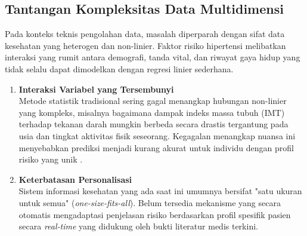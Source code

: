\subsection{Tantangan Kompleksitas Data Multidimensi}
Pada konteks teknis pengolahan data, masalah diperparah dengan sifat data kesehatan yang heterogen dan non-linier. Faktor risiko hipertensi melibatkan interaksi yang rumit antara demografi, tanda vital, dan riwayat gaya hidup yang tidak selalu dapat dimodelkan dengan regresi linier sederhana.

\begin{enumerate}
    \item \textbf{Interaksi Variabel yang Tersembunyi}\\
    Metode statistik tradisional sering gagal menangkap hubungan non-linier yang kompleks, misalnya bagaimana dampak indeks massa tubuh (IMT) terhadap tekanan darah mungkin berbeda secara drastis tergantung pada usia dan tingkat aktivitas fisik seseorang. Kegagalan menangkap nuansa ini menyebabkan prediksi menjadi kurang akurat untuk individu dengan profil risiko yang unik \parencite{Elshawi2019Interpretability}.
    
    \item \textbf{Keterbatasan Personalisasi}\\
    Sistem informasi kesehatan yang ada saat ini umumnya bersifat "satu ukuran untuk semua" (\textit{one-size-fits-all}). Belum tersedia mekanisme yang secara otomatis mengadaptasi penjelasan risiko berdasarkan profil spesifik pasien secara \textit{real-time} yang didukung oleh bukti literatur medis terkini.
\end{enumerate}

